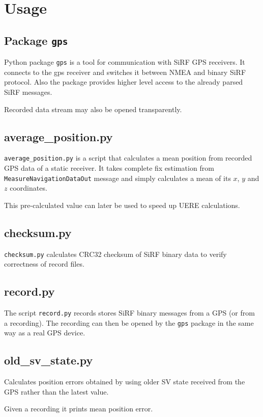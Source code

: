 \section{Usage}
\subsection{Package \lstinline=gps=}
Python package \lstinline=gps= is a tool for communication with SiRF GPS receivers.
It connects to the gps receiver and switches it between NMEA and binary SiRF protocol.
Also the package provides higher level access to the already parsed SiRF messages.

Recorded data stream may also be opened transparently.

\subsection{average\_position.py}
\verb=average_position.py= is a script that calculates a mean position from recorded
GPS data of a static receiver.
It takes complete fix estimation from \verb=MeasureNavigationDataOut= message and simply
calculates a mean of its \(x\), \(y\) and \(z\) coordinates.

This pre-calculated value can later be used to speed up UERE calculations.

\subsection{checksum.py}
\verb=checksum.py= calculates CRC32 checksum of SiRF binary data to verify
correctness of record files.

\subsection{record.py}
The script \verb=record.py= records stores SiRF binary messages from a GPS (or from a recording).
The recording can then be opened by the \lstinline=gps= package in the same way as a real GPS
device.

\subsection{old\_sv\_state.py}
Calculates position errors obtained by using older SV state received from
the GPS rather than the latest value.

Given a recording it prints mean position error.
